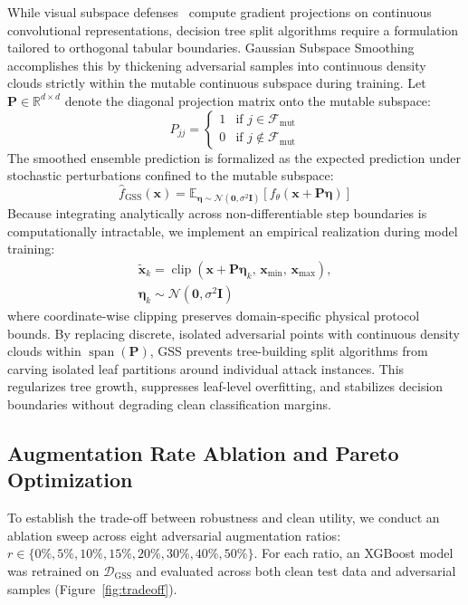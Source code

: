 \documentclass[iicol,pdflatex,sn-mathphys-num]{sn-jnl}
\begin{document}
While visual subspace defenses~\cite{li2021subspace} compute gradient projections on continuous convolutional representations, decision tree split algorithms require a formulation tailored to orthogonal tabular boundaries. Gaussian Subspace Smoothing accomplishes this by thickening adversarial samples into continuous density clouds strictly within the mutable continuous subspace during training. Let $\mathbf{P} \in \mathbb{R}^{d \times d}$ denote the diagonal projection matrix onto the mutable subspace:
\begin{equation}
    P_{jj} = \begin{cases} 1 & \text{if } j \in \mathcal{F}_{\text{mut}} \\ 0 & \text{if } j \notin \mathcal{F}_{\text{mut}} \end{cases}
\end{equation}
The smoothed ensemble prediction is formalized as the expected prediction under stochastic perturbations confined to the mutable subspace:
\begin{equation}
    \hat{f}_{\text{GSS}}(\mathbf{x}) = \mathbb{E}_{\boldsymbol{\eta} \sim \mathcal{N}\left(\mathbf{0}, \sigma^2 \mathbf{I}\right)}\left[ f_\theta\left(\mathbf{x} + \mathbf{P}\boldsymbol{\eta}\right) \right]
\end{equation}
Because integrating analytically across non-differentiable step boundaries is computationally intractable, we implement an empirical realization during model training:
\begin{multline}
    \tilde{\mathbf{x}}_k = \operatorname{clip}\!\left(\mathbf{x} + \mathbf{P}\boldsymbol{\eta}_k, \, \mathbf{x}_{\min}, \, \mathbf{x}_{\max}\right),\\
    \boldsymbol{\eta}_k \sim \mathcal{N}\!\left(\mathbf{0}, \sigma^2 \mathbf{I}\right)
\end{multline}
where coordinate-wise clipping preserves domain-specific physical protocol bounds. By replacing discrete, isolated adversarial points with continuous density clouds within $\operatorname{span}(\mathbf{P})$, GSS prevents tree-building split algorithms from carving isolated leaf partitions around individual attack instances. This regularizes tree growth, suppresses leaf-level overfitting, and stabilizes decision boundaries without degrading clean classification margins.

\subsection{Augmentation Rate Ablation and Pareto Optimization}
To establish the trade-off between robustness and clean utility, we conduct an ablation sweep across eight adversarial augmentation ratios: $r \in \{0\%, 5\%, 10\%, 15\%, 20\%, 30\%, 40\%, 50\%\}$. For each ratio, an XGBoost model was retrained on $\mathcal{D}_{\text{GSS}}$ and evaluated across both clean test data and adversarial samples (Figure~\ref{fig:tradeoff}).
\end{document}
